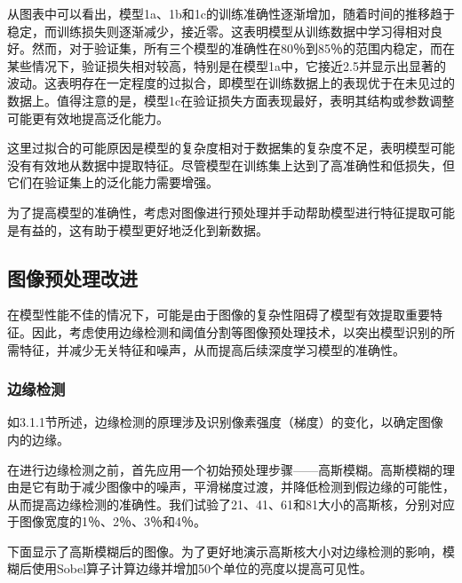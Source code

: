从图表中可以看出，模型1a、1b和1c的训练准确性逐渐增加，随着时间的推移趋于稳定，而训练损失则逐渐减少，接近零。这表明模型从训练数据中学习得相对良好。然而，对于验证集，所有三个模型的准确性在80％到85％的范围内稳定，而在某些情况下，验证损失相对较高，特别是在模型1a中，它接近2.5并显示出显著的波动。这表明存在一定程度的过拟合，即模型在训练数据上的表现优于在未见过的数据上。值得注意的是，模型1c在验证损失方面表现最好，表明其结构或参数调整可能更有效地提高泛化能力。

这里过拟合的可能原因是模型的复杂度相对于数据集的复杂度不足，表明模型可能没有有效地从数据中提取特征。尽管模型在训练集上达到了高准确性和低损失，但它们在验证集上的泛化能力需要增强。

为了提高模型的准确性，考虑对图像进行预处理并手动帮助模型进行特征提取可能是有益的，这有助于模型更好地泛化到新数据。

\subsection{图像预处理改进}

在模型性能不佳的情况下，可能是由于图像的复杂性阻碍了模型有效提取重要特征。因此，考虑使用边缘检测和阈值分割等图像预处理技术，以突出模型识别的所需特征，并减少无关特征和噪声，从而提高后续深度学习模型的准确性。

\subsubsection{边缘检测}

如3.1.1节所述，边缘检测的原理涉及识别像素强度（梯度）的变化，以确定图像内的边缘。

在进行边缘检测之前，首先应用一个初始预处理步骤——高斯模糊。高斯模糊的理由是它有助于减少图像中的噪声，平滑梯度过渡，并降低检测到假边缘的可能性，从而提高边缘检测的准确性\cite{4.3}。我们试验了21、41、61和81大小的高斯核，分别对应于图像宽度的1％、2％、3％和4％。

下面显示了高斯模糊后的图像。为了更好地演示高斯核大小对边缘检测的影响，模糊后使用Sobel算子计算边缘并增加50个单位的亮度以提高可见性。

